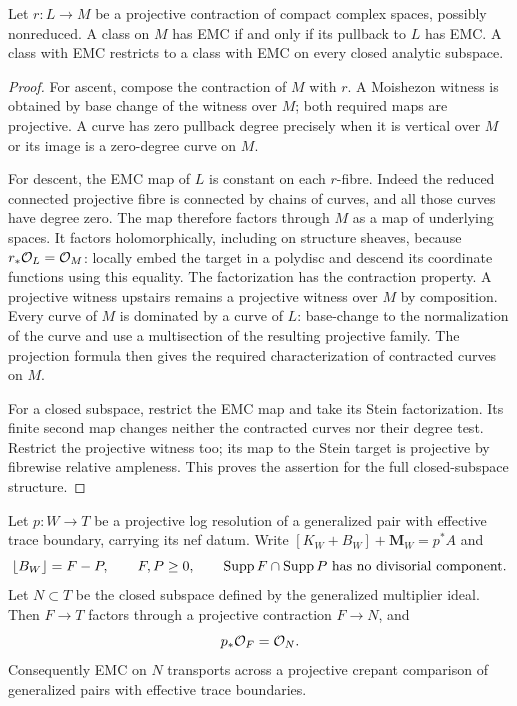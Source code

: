 \begin{lemma}
\label{repair:lem:emc-transfer}
Let $r:L\to M$ be a projective contraction of compact complex
spaces, possibly nonreduced. A class on $M$ has EMC if and only if
its pullback to $L$ has EMC. A class with EMC restricts to a class
with EMC on every closed analytic subspace.
\end{lemma}

\begin{proof}
For ascent, compose the contraction of $M$ with $r$. A Moishezon
witness is obtained by base change of the witness over $M$; both
required maps are projective. A curve has zero pullback degree
precisely when it is vertical over $M$ or its image is a
zero-degree curve on $M$.

For descent, the EMC map of $L$ is constant on each $r$-fibre.
Indeed the reduced connected projective fibre is connected by
chains of curves, and all those curves have degree zero. The map
therefore factors through $M$ as a map of underlying spaces. It
factors holomorphically, including on structure sheaves, because
$r_*\mathcal O_L=\mathcal O_M$: locally embed the target in a polydisc and
descend its coordinate functions using this equality. The
factorization has the contraction property. A projective witness
upstairs remains a projective witness over $M$ by composition.
Every curve of $M$ is dominated by a curve of $L$: base-change to
the normalization of the curve and use a multisection of the
resulting projective family. The projection formula then gives
the required characterization of contracted curves on $M$.

For a closed subspace, restrict the EMC map and take its Stein
factorization. Its finite second map changes neither the contracted
curves nor their degree test. Restrict the projective witness too;
its map to the Stein target is projective by fibrewise relative
ampleness. This proves the assertion for the full closed-subspace
structure.
\end{proof}

\begin{lemma}
\label{repair:lem:multiplier-scheme-transfer}
Let $p:W\to T$ be a projective log resolution of a generalized
pair with effective trace boundary, carrying its nef datum.
Write $[K_W+B_W]+\mathbf M_W=p^*A$ and
\[
                \lfloor B_W\rfloor=F-P,
 \qquad F,P\geq0,\qquad \operatorname{Supp} F\cap\operatorname{Supp} P
       \ \text{has no divisorial component}.
\]
Let $N\subset T$ be the closed subspace defined by the generalized
multiplier ideal. Then $F\to T$ factors through a projective
contraction $F\to N$, and
\[
                              p_*\mathcal O_F=\mathcal O_N.
\]
Consequently EMC on $N$ transports across a projective crepant
comparison of generalized pairs with effective trace boundaries.
\end{lemma}

